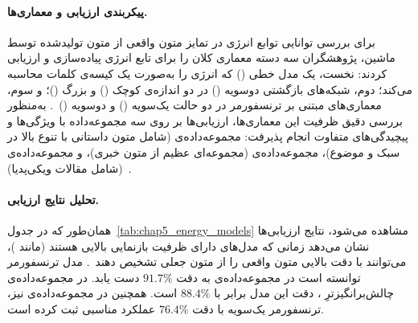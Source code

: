 \paragraph{پیکربندی ارزیابی و معماری‌ها.}
برای بررسی توانایی توابع انرژی در تمایز متون واقعی از متون تولیدشده توسط ماشین، پژوهشگران سه دسته معماری کلان را برای تابع انرژی پیاده‌سازی و ارزیابی کردند: نخست، یک مدل خطی () که انرژی را به‌صورت یک کیسه‌ی کلمات محاسبه می‌کند؛ دوم، شبکه‌های بازگشتی دوسویه () در دو اندازه‌ی کوچک () و بزرگ ()؛ و سوم، معماری‌های مبتنی بر ترنسفورمر در دو حالت یک‌سویه () و دوسویه ()~\cite{bakhtin2019realfake}. به‌منظور بررسی دقیق ظرفیت این معماری‌ها، ارزیابی‌ها بر روی سه مجموعه‌داده با ویژگی‌ها و پیچیدگی‌های متفاوت انجام پذیرفت: مجموعه‌داده‌ی  (شامل متون داستانی با تنوع بالا در سبک و موضوع)، مجموعه‌داده‌ی  (مجموعه‌ای عظیم از متون خبری)، و مجموعه‌داده‌ی  (شامل مقالات ویکی‌پدیا)~\cite{bakhtin2019realfake}.

\paragraph{تحلیل نتایج ارزیابی.}
همان‌طور که در جدول~\ref{tab:chap5_energy_models} مشاهده می‌شود، نتایج ارزیابی‌ها نشان می‌دهد زمانی که مدل‌های  دارای ظرفیت بازنمایی بالایی هستند (مانند )، می‌توانند با دقت بالایی متون واقعی را از متون جعلی تشخیص دهند~\cite{bakhtin2019realfake}. مدل ترنسفورمر توانسته است در مجموعه‌داده‌ی  به دقت $91.7\%$ دست یابد. در مجموعه‌داده‌ی چالش‌برانگیزترِ ، دقت این مدل برابر با $88.4\%$ است. همچنین در مجموعه‌داده‌ی  نیز، ترنسفورمر یک‌سویه با دقت $76.4\%$ عملکرد مناسبی ثبت کرده است.

